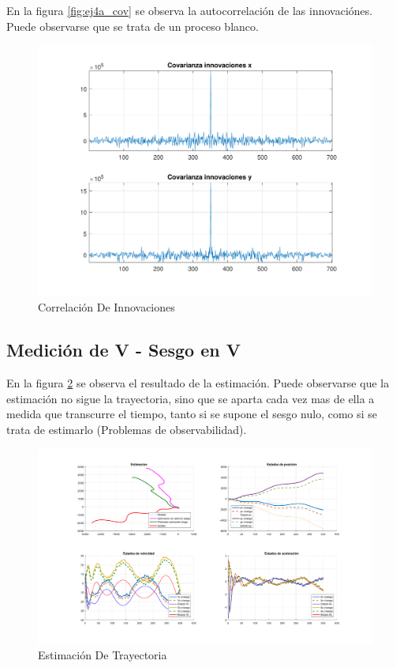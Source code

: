 	En la figura \ref{fig:ej4a_cov} se observa la autocorrelación de las innovaciónes. Puede observarse que se trata de un proceso blanco.
	
	\begin{figure}[H]
		\centering
		\includegraphics[width=1.0\textwidth,keepaspectratio]{Figuras/covinn_ej4b.pdf}
		\caption{Correlación De Innovaciones}
		\label{fig:ej4b_cov}
	\end{figure}
	
	
\subsection{Medición de V - Sesgo en V}

	En la figura \ref{fig:ej4c} se observa el resultado de la estimación. Puede observarse que la estimación no sigue la trayectoria, sino que se aparta cada vez mas de ella a medida que transcurre el tiempo, tanto si se supone el sesgo nulo, como si se trata de estimarlo (Problemas de observabilidad).

	\begin{figure}[H]
		\centering
		\includegraphics[width=1.0\textwidth,keepaspectratio]{Figuras/graf_ej4c.pdf}
		\caption{Estimación De Trayectoria}
		\label{fig:ej4c}
	\end{figure}
	
